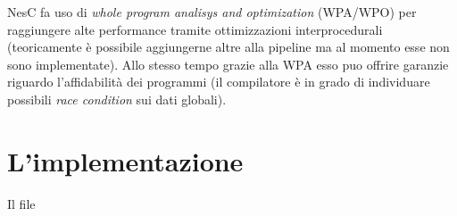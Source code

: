 \documentclass[pdftex,12pt,a4paper,italian,openany]{book}
\begin{document}
NesC fa uso di \emph{whole program analisys and optimization} (WPA/WPO) per raggiungere alte 
performance tramite ottimizzazioni interprocedurali (teoricamente è possibile aggiungerne altre 
alla pipeline ma al momento esse non sono implementate).
Allo stesso tempo grazie alla WPA esso puo offrire garanzie riguardo l'affidabilità dei 
programmi (il compilatore è in grado di individuare possibili \emph{race condition} sui dati globali).


\chapter{L'implementazione}
Il file 
\end{document}
